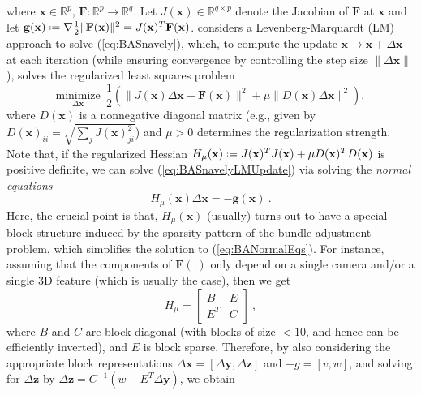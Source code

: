 \documentclass[10pt]{article}
\newcommand{\R}{\ensuremath{\mathbb{R}}}
\newcommand*{\defeq}{\mathrel{\vcenter{\baselineskip0.5ex \lineskiplimit0pt
                     \hbox{\scriptsize.}\hbox{\scriptsize.}}}
                     =}
\begin{document}
where $\mathbf{x}\in\R^p$, $\mathbf{F}:\R^p\rightarrow\R^q$. Let $J(\mathbf{x})\in\R^{q\times p}$ denote the Jacobian of $\mathbf{F}$ at $\mathbf{x}$ and let $\mathbf{g}(\mathbf{x}) \defeq \nabla\frac{1}{2}\|\mathbf{F}(\mathbf{x})\|^2 = J(\mathbf{x})^T\mathbf{F}(\mathbf{x})$. \cite{SnavelyBALarge} considers a Levenberg-Marquardt (LM) approach to solve (\ref{eq:BASnavely}), which, to compute the update $\mathbf{x}\rightarrow\mathbf{x}+\Delta\mathbf{x}$ at each iteration (while ensuring convergence by controlling the step size $\|\Delta\mathbf{x}\|$), solves the regularized least squares problem
\begin{equation}
\label{eq:BASnavelyLMUpdate}
\underset{{\scriptstyle \Delta\mathbf{x}}}{\text{minimize}} \ \ \frac{1}{2}\left(\|J(\mathbf{x})\Delta\mathbf{x} + \mathbf{F}(\mathbf{x})\|^2 + \mu \|D(\mathbf{x})\Delta\mathbf{x}\|^2\right) ,
\end{equation}
where $D(\mathbf{x})$ is a nonnegative diagonal matrix (e.g., given by $D(\mathbf{x})_{ii} = \sqrt{\sum_{j}J(\mathbf{x})_{ji}^2}$) and $\mu > 0$ determines the regularization strength. Note that, if the regularized Hessian $H_{\mu}(\mathbf{x})\defeq J(\mathbf{x})^TJ(\mathbf{x}) + \mu D(\mathbf{x})^TD(\mathbf{x})$ is positive definite, we can solve (\ref{eq:BASnavelyLMUpdate}) via solving the \textit{normal equations}
\begin{equation}
\label{eq:BANormalEqs}
H_{\mu}(\mathbf{x})\Delta\mathbf{x} = -\mathbf{g}(\mathbf{x}) \ .
\end{equation}
Here, the crucial point is that, $H_{\mu}(\mathbf{x})$ (usually) turns out to have a special block structure induced by the sparsity pattern of the bundle adjustment problem, which simplifies the solution to (\ref{eq:BANormalEqs}). For instance, assuming that the components of $\mathbf{F}(.)$ only depend on a single camera and/or a single $3$D feature (which is usually the case), then we get 
\begin{equation}
\label{eq:BAHessBlock}
H_{\mu} = \left[\begin{matrix} B & E \\ E^T & C \end{matrix}\right] \ ,
\end{equation}
where $B$ and $C$ are block diagonal (with blocks of size $<10$, and hence can be efficiently inverted), and $E$ is block sparse. Therefore, by also considering the appropriate block representations $\Delta\mathbf{x} = [\Delta\mathbf{y}, \Delta\mathbf{z}]$ and $-g = [v,w]$, and solving for $\Delta\mathbf{z}$ by $\Delta\mathbf{z} = C^{-1}(w-E^T\Delta\mathbf{y})$, we obtain
\end{document}
